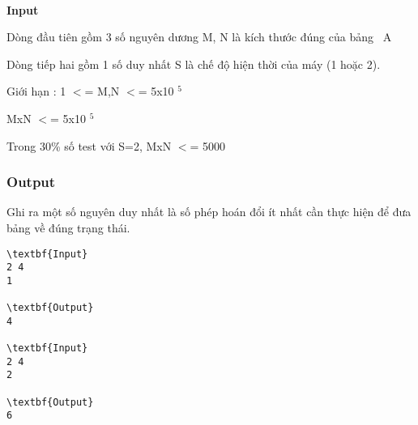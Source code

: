 \\\textbf{Input }\textbf{}

Dòng đầu tiên gồm 3 số nguyên dương M, N là kích thước đúng của bảng  A

Dòng tiếp hai gồm 1 số duy nhất S là chế độ hiện thời của máy (1 hoặc 2).

Giới hạn : 1 $<$= M,N $<$= 5x10 $^ 5 $

MxN $<$= 5x10 $^ 5 $

Trong 30\% số test với S=2, MxN $<$= 5000

\subsubsection{Output}

Ghi ra một số nguyên duy nhất là số phép hoán đổi ít nhất cần thực hiện để đưa bảng về đúng trạng thái.
\begin{verbatim}
\textbf{Input}
2 4
1

\textbf{Output}
4

\textbf{Input}
2 4
2

\textbf{Output}
6\end{verbatim}